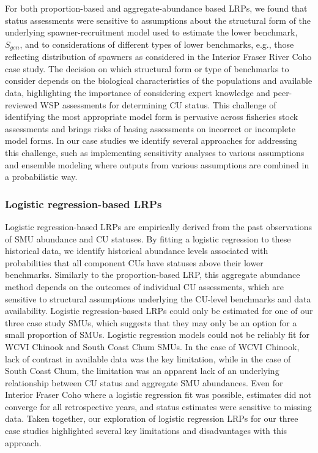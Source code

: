 \documentclass[11pt]{book}
\begin{document}
For both proportion-based and aggregate-abundance based LRPs, we found that status assessments were sensitive to assumptions about the structural form of the underlying spawner-recruitment model used to estimate the lower benchmark, \(S_{gen}\), and to considerations of different types of lower benchmarks, e.g., those reflecting distribution of spawners as considered in the Interior Fraser River Coho case study. The decision on which structural form or type of benchmarks to consider depends on the biological characteristics of the populations and available data, highlighting the importance of considering expert knowledge and peer-reviewed WSP assessments for determining CU status. This challenge of identifying the most appropriate model form is pervasive across fisheries stock assessments and brings risks of basing assessments on incorrect or incomplete model forms. In our case studies we identify several approaches for addressing this challenge, such as implementing sensitivity analyses to various assumptions and ensemble modeling where outputs from various assumptions are combined in a probabilistic way.

\hypertarget{logistic-regression-based-lrps}{%
\subsubsection{Logistic regression-based LRPs}\label{logistic-regression-based-lrps}}

Logistic regression-based LRPs are empirically derived from the past observations of SMU abundance and CU statuses. By fitting a logistic regression to these historical data, we identify historical abundance levels associated with probabilities that all component CUs have statuses above their lower benchmarks. Similarly to the proportion-based LRP, this aggregate abundance method depends on the outcomes of individual CU assessments, which are sensitive to structural assumptions underlying the CU-level benchmarks and data availability. Logistic regression-based LRPs could only be estimated for one of our three case study SMUs, which suggests that they may only be an option for a small proportion of SMUs. Logistic regression models could not be reliably fit for WCVI Chinook and South Coast Chum SMUs. In the case of WCVI Chinook, lack of contrast in available data was the key limitation, while in the case of South Coast Chum, the limitation was an apparent lack of an underlying relationship between CU status and aggregate SMU abundances. Even for Interior Fraser Coho where a logistic regression fit was possible, estimates did not converge for all retrospective years, and status estimates were sensitive to missing data. Taken together, our exploration of logistic regression LRPs for our three case studies highlighted several key limitations and disadvantages with this approach.
\end{document}
